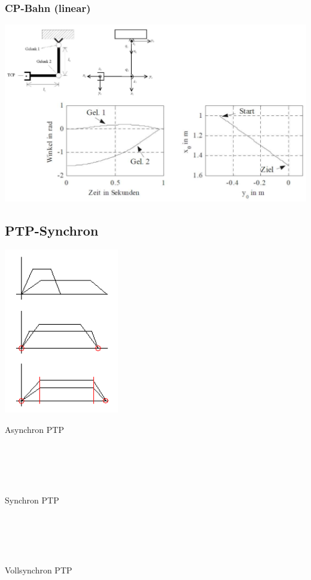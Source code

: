 \begin{multicols}{3}
\begin{minipage}{\linewidth}
        \subsubsection{CP-Bahn (linear)}
        \includegraphics[width=\linewidth]{./bilder/VBCPB}
    \end{minipage}
\end{multicols}

	\subsection{PTP-Synchron}
\begin{minipage}{6cm}
    \includegraphics[width=5cm]{./bilder/synchron.png}
\end{minipage}
\begin{minipage}{12.5cm}
    Asynchron PTP\\ \\ \\ \\ \\ \\
    Synchron PTP\\ \\ \\ \\ \\ \\
    Vollsynchron PTP\\
\end{minipage}